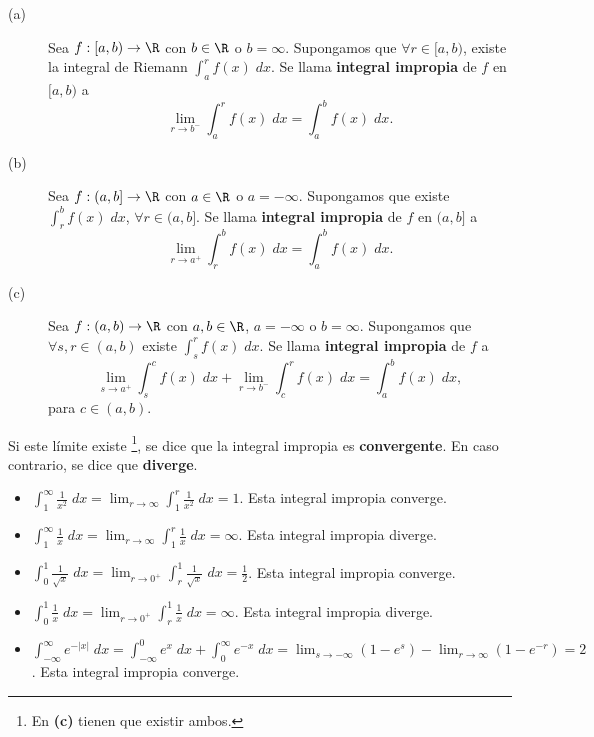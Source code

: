 \begin{fdefinition}
\normalfont 
\begin{description}
	\item[(a)] Sea $\displaystyle f : \left[a,b\right) \to \R  $ con $\displaystyle b \in \R $ o $\displaystyle b = \infty $. Supongamos que $\displaystyle \forall r \in [a,b)$, existe la integral de Riemann $\displaystyle \int^{r}_{a} f\left(x\right) \; dx $. Se llama \textbf{integral impropia} de $\displaystyle f $ en $\displaystyle [a,b) $ a
		\[\lim_{r \to b^{-}}\int^{r}_{a} f\left(x\right) \; dx = \int^{b}_{a} f\left(x\right) \; dx .\]
\item[(b)] Sea $\displaystyle f: (a,b]\to \R $ con $\displaystyle a \in \R $ o $\displaystyle a = -\infty  $. Supongamos que existe $\displaystyle \int^{b}_{r} f\left(x\right) \; dx$, $\displaystyle \forall r \in (a,b] $. Se llama \textbf{integral impropia} de $\displaystyle f $  en $\displaystyle (a,b] $ a
	\[\lim_{r \to a^{+}}\int^{b}_{r} f\left(x\right) \; dx = \int^{b}_{a} f\left(x\right) \; dx .\]
\item[(c)] Sea $\displaystyle f : \left(a,b\right) \to \R $ con $\displaystyle a,b \in \R $, $\displaystyle a = - \infty $ o $\displaystyle b = \infty $. Supongamos que $\displaystyle \forall s,r \in \left(a,b\right) $ existe $\displaystyle \int^{r}_{s} f\left(x\right) \; dx $. Se llama \textbf{integral impropia} de $\displaystyle f $ a
	\[\lim_{s \to a^{+}}\int^{c}_{s} f\left(x\right) \; dx + \lim_{r \to b^{-}} \int^{r}_{c} f\left(x\right) \; dx = \int^{b}_{a} f\left(x\right) \; dx,\]
	para $\displaystyle c \in \left(a,b\right) $.
\end{description}
Si este límite existe \footnote{En \textbf{(c)} tienen que existir ambos.}, se dice que la integral impropia es \textbf{convergente}. En caso contrario, se dice que \textbf{diverge}.
\end{fdefinition}
\begin{eg}
\normalfont 
\begin{itemize}
\item $\displaystyle \int^{\infty}_{1} \frac{1}{x^{2}} \; dx = \lim_{r \to \infty }\int^{r}_{1} \frac{1}{x^{2}} \; dx = 1 $. Esta integral impropia converge.
\item $\displaystyle \int^{\infty}_{1} \frac{1}{x} \; dx = \lim_{r \to \infty }\int^{r}_{1} \frac{1}{x} \; dx = \infty  $. Esta integral impropia diverge.
\item $\displaystyle \int^{1}_{0} \frac{1}{\sqrt{x}} \; dx = \lim_{r \to 0^{+}}\int^{1}_{r} \frac{1}{\sqrt{x}} \; dx = \frac{1}{2} $. Esta integral impropia converge.
\item $\displaystyle \int^{1}_{0} \frac{1}{x} \; dx = \lim_{r \to 0^{+}}\int^{1}_{r} \frac{1}{x} \; dx = \infty $. Esta integral impropia diverge.
\item $\displaystyle \int^{\infty}_{-\infty} e^{- \left|x\right|} \; dx = \int^{0}_{-\infty} e^{x} \; dx + \int^{\infty}_{0} e^{-x} \; dx = \lim_{s \to -\infty}\left(1-e^{s}\right) -\lim_{r \to \infty}\left(1 - e^{-r}\right) = 2 $. Esta integral impropia converge.
\end{itemize}
\end{eg}
